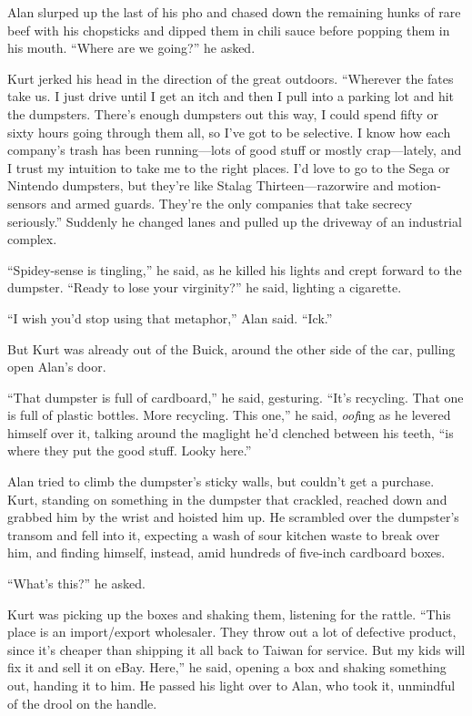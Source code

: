 \documentclass{article}
\begin{document}
Alan slurped up the last of his pho and chased down the remaining
hunks of rare beef with his chopsticks and dipped them in chili sauce
before popping them in his mouth.  ``Where are we going?'' he asked.

Kurt jerked his head in the direction of the great outdoors. 
``Wherever the fates take us.  I just drive until I get an itch and
then I pull into a parking lot and hit the dumpsters.  There's enough
dumpsters out this way, I could spend fifty or sixty hours going
through them all, so I've got to be selective.  I know how each
company's trash has been running---lots of good stuff or mostly
crap---lately, and I trust my intuition to take me to the right
places.  I'd love to go to the Sega or Nintendo dumpsters, but they're
like Stalag Thirteen---razorwire and motion-sensors and armed guards. 
They're the only companies that take secrecy seriously.'' Suddenly he
changed lanes and pulled up the driveway of an industrial complex.

``Spidey-sense is tingling,'' he said, as he killed his lights and
crept forward to the dumpster.  ``Ready to lose your virginity?'' he
said, lighting a cigarette.

``I wish you'd stop using that metaphor,'' Alan said.  ``Ick.''

But Kurt was already out of the Buick, around the other side of the
car, pulling open Alan's door.

``That dumpster is full of cardboard,'' he said, gesturing.  ``It's
recycling.  That one is full of plastic bottles.  More recycling. 
This one,'' he said, \textit{oof}ing as he levered himself over it,
talking around the maglight he'd clenched between his teeth, ``is
where they put the good stuff.  Looky here.''

Alan tried to climb the dumpster's sticky walls, but couldn't get a
purchase.  Kurt, standing on something in the dumpster that crackled,
reached down and grabbed him by the wrist and hoisted him up.  He
scrambled over the dumpster's transom and fell into it, expecting a
wash of sour kitchen waste to break over him, and finding himself,
instead, amid hundreds of five-inch cardboard boxes.

``What's this?'' he asked.

Kurt was picking up the boxes and shaking them, listening for the
rattle.  ``This place is an import/export wholesaler.  They throw out
a lot of defective product, since it's cheaper than shipping it all
back to Taiwan for service.  But my kids will fix it and sell it on
eBay.  Here,'' he said, opening a box and shaking something out,
handing it to him.  He passed his light over to Alan, who took it,
unmindful of the drool on the handle.
\end{document}
